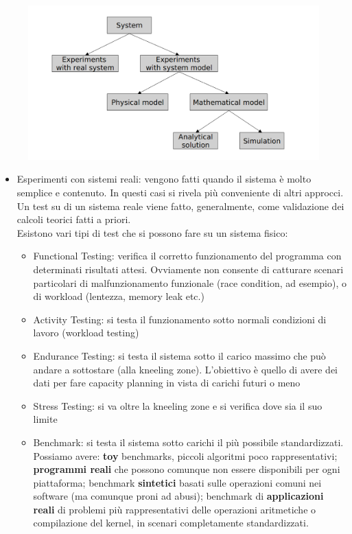 \documentclass{article}
\begin{document}
		\begin{figure}[ht]
			\centering
			\includegraphics[width=0.7\linewidth]{SAC_D1_approaches}
			\label{fig:sacd1approaches}
		\end{figure}
		
		\begin{itemize}
			\item Esperimenti con sistemi reali: vengono fatti quando il sistema è molto semplice e contenuto. In questi casi si rivela più conveniente di altri approcci.\\
			Un test su di un sistema reale viene fatto, generalmente, come validazione dei calcoli teorici fatti a
			priori.\\
			Esistono vari tipi di test che si possono fare su un sistema fisico:
			\begin{itemize}
				\item Functional Testing: verifica il corretto funzionamento del programma con determinati risultati attesi. Ovviamente non consente di catturare
				scenari particolari di malfunzionamento funzionale (race condition, ad esempio), o di workload
				(lentezza, memory leak etc.)
				\item Activity Testing: si testa il funzionamento sotto normali condizioni di lavoro (workload testing)
				\item Endurance Testing: si testa il sistema sotto il carico massimo che può andare a sottostare (alla
				kneeling zone). L'obiettivo è quello di avere dei dati per fare capacity planning in vista di carichi futuri o meno
				\item Stress Testing: si va oltre la kneeling zone e si verifica dove sia il suo limite
				\item Benchmark: si testa il sistema sotto carichi il più possibile standardizzati. Possiamo avere: \textbf{toy} benchmarks, piccoli algoritmi poco rappresentativi; \textbf{programmi reali} che possono comunque non essere disponibili per ogni piattaforma; benchmark \textbf{sintetici} basati sulle operazioni comuni nei software (ma comunque proni ad abusi); benchmark di \textbf{applicazioni reali} di problemi più rappresentativi delle operazioni aritmetiche o compilazione del kernel, in scenari completamente standardizzati.
			\end{itemize}
		

\end{itemize}
\end{document}
